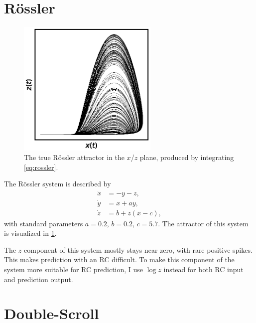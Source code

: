 \section{R{\"{o}}ssler}\label{sec:rossler}

\begin{figure}
  \includegraphics[width=0.6\textwidth]{figures/rossler}
  \caption{The true R{\"{o}}ssler attractor in the $x$/$z$ plane, produced by integrating \cref{eq:rossler}.}%
  \label{fig:rossler}
\end{figure}

The R{\"{o}}ssler system is described by
\begin{equation}
  \begin{aligned}
    \dot{x} &= - y - z, \\
    \dot{y} &= x + a y, \\
    \dot{z} &= b + z (x - c),
  \end{aligned}
  \label{eq:rossler}
\end{equation}
with standard parameters $a = 0.2$, $b = 0.2$, $c =
5.7$.\cite{rossler1976} The attractor of this system is visualized in
\cref{fig:rossler}.

The $z$ component of this system mostly stays near zero, with rare
positive spikes. This makes prediction with an RC difficult. To make
this component of the system more suitable for RC prediction, I use
$\log z$ instead for both RC input and prediction output.

\section{Double-Scroll}\label{sec:dscroll}

